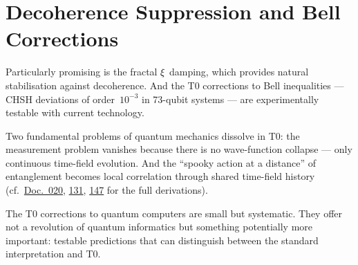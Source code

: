 \section{Decoherence Suppression and Bell Corrections}

Particularly promising is the fractal $\xi$ damping, which provides natural stabilisation against decoherence. And the T0 corrections to Bell inequalities --- CHSH deviations of order~$10^{-3}$ in 73-qubit systems --- are experimentally testable with current technology.

Two fundamental problems of quantum mechanics dissolve in T0: the measurement problem vanishes because there is no wave-function collapse --- only continuous time-field evolution. And the ``spooky action at a distance'' of entanglement becomes local correlation through shared time-field history (cf.\ \href{https://github.com/jpascher/T0-Time-Mass-Duality/blob/main/2/pdf/020_T0_QM-QFT-RT_De.pdf}{Doc.~020}, \href{https://github.com/jpascher/T0-Time-Mass-Duality/blob/main/2/pdf/131_scheinbar_instantan_De.pdf}{131}, \href{https://github.com/jpascher/T0-Time-Mass-Duality/blob/main/2/pdf/147_quantum_computing_De.pdf}{147} for the full derivations).

\begin{kerngedanke}
The T0 corrections to quantum computers are small but systematic. They offer not a revolution of quantum informatics but something potentially more important: testable predictions that can distinguish between the standard interpretation and T0.
\end{kerngedanke}
